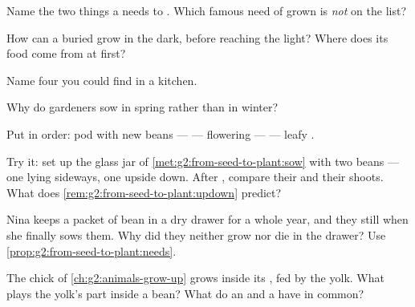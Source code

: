 \begin{exercise}[$\star$]\label{exo:g2:from-seed-to-plant:3}
Name the two things a  needs to . Which famous need
of grown  is \emph{not} on the list?
\end{exercise}

\begin{exercise}[$\star$]\label{exo:g2:from-seed-to-plant:4}
How can a buried  grow in the dark, before reaching the
light? Where does its food come from at first?
\end{exercise}

\begin{exercise}[$\star$]\label{exo:g2:from-seed-to-plant:5}
Name four  you could find in a kitchen.
\end{exercise}

\begin{exercise}[$\star$]\label{exo:g2:from-seed-to-plant:6}
Why do gardeners sow in spring rather than in winter?
\end{exercise}

\begin{exercise}[$\star$]\label{exo:g2:from-seed-to-plant:7}
Put in order: pod with new beans ---  --- flowering  ---
 --- leafy .
\end{exercise}

\begin{exercise}[$\star$]\label{exo:g2:from-seed-to-plant:8}
Try it: set up the glass jar of \cref{met:g2:from-seed-to-plant:sow}
with two beans --- one lying sideways, one upside down. After
, compare their  and their shoots. What does
\cref{rem:g2:from-seed-to-plant:updown} predict?
\end{exercise}

\begin{exercise}[$\star\star$]\label{exo:g2:from-seed-to-plant:9}
Nina keeps a packet of bean  in a dry drawer for a whole
year, and they still  when she finally sows them. Why did
they neither grow nor die in the drawer? Use
\cref{prop:g2:from-seed-to-plant:needs}.
\end{exercise}

\begin{exercise}[$\star\star$]\label{exo:g2:from-seed-to-plant:10}
The chick of \cref{ch:g2:animals-grow-up} grows inside its ,
fed by the yolk. What plays the yolk's part inside a bean? What do
an  and a  have in common?
\end{exercise}
